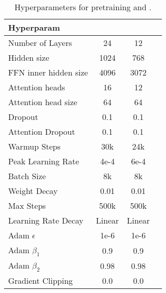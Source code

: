 \begin{table*}[t]
\begin{center}
\begin{tabular}{lccc}
\toprule
\bf Hyperparam  & \bf \ourmodellarge{} & \bf \ourmodelbase{} \\
\midrule 
Number of Layers & 24 & 12 \\
Hidden size & 1024 & 768 \\
FFN inner hidden size & 4096 & 3072 \\
Attention heads & 16 & 12 \\
Attention head size & 64 & 64 \\
Dropout & 0.1 & 0.1 \\
Attention Dropout & 0.1 & 0.1 \\
Warmup Steps & 30k & 24k \\
Peak Learning Rate & 4e-4 & 6e-4 \\
Batch Size & 8k & 8k\\
Weight Decay & 0.01 & 0.01 \\
Max Steps & 500k & 500k\\
Learning Rate Decay & Linear & Linear \\
Adam $\epsilon$ & 1e-6 & 1e-6 \\
Adam $\beta_1$ & 0.9 & 0.9 \\
Adam $\beta_2$ & 0.98 & 0.98 \\
Gradient Clipping & 0.0 & 0.0 \\
\bottomrule
\end{tabular}
\end{center}
\caption{
Hyperparameters for pretraining \ourmodellarge{} and \ourmodelbase{}.
}
\label{tab:pretraining_hyperparams}
\end{table*}